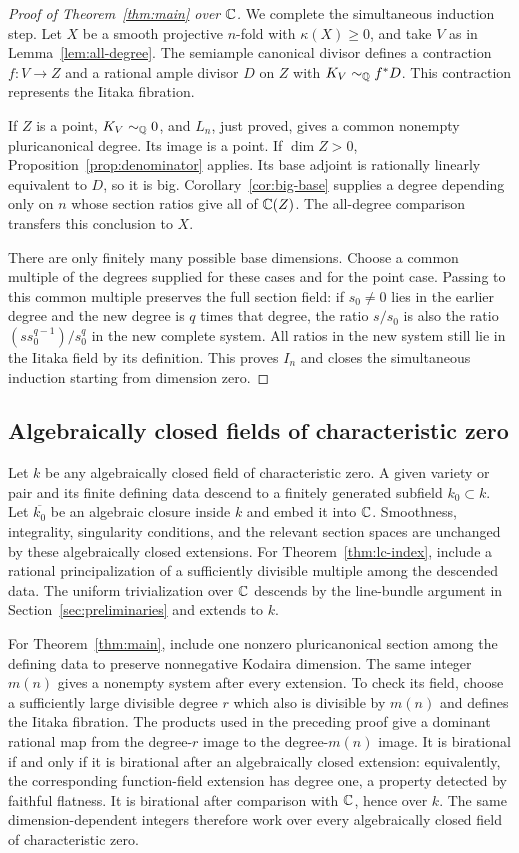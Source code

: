 \begin{proof}[Proof of Theorem~\ref{thm:main} over $\mathbb C$]
We complete the simultaneous induction step. Let $X$ be a smooth
projective $n$-fold with $\kappa(X)\geq0$, and take $V$ as in
Lemma~\ref{lem:all-degree}. The semiample canonical divisor defines a
contraction $f:V\to Z$ and a rational ample divisor $D$ on $Z$ with
$K_V\sim_\mathbb Q f^*D$. This contraction represents the Iitaka fibration.

If $Z$ is a point, $K_V\sim_\mathbb Q0$, and $L_n$, just proved, gives a
common nonempty pluricanonical degree. Its image is a point.
If $\dim Z>0$, Proposition~\ref{prop:denominator} applies. Its base
adjoint is rationally linearly equivalent to $D$, so it is big.
Corollary~\ref{cor:big-base} supplies a degree depending only on $n$
whose section ratios give all of $\mathbb C(Z)$. The all-degree comparison
transfers this conclusion to $X$.

There are only finitely many possible base dimensions. Choose a common
multiple of the degrees supplied for these cases and for the point
case. Passing to this common multiple preserves the full section
field: if $s_0\ne0$ lies in the earlier degree and the new degree is
$q$ times that degree, the ratio $s/s_0$ is also the ratio
$(s s_0^{q-1})/s_0^q$ in the new complete system. All ratios in the
new system still lie in the Iitaka field by its definition. This
proves $I_n$ and closes the simultaneous induction starting from
dimension zero.
\end{proof}

\subsection{Algebraically closed fields of characteristic zero}

Let $k$ be any algebraically closed field of characteristic zero.
A given variety or pair and its finite defining data descend to a
finitely generated subfield $k_0\subset k$. Let $\overline{k_0}$ be an
algebraic closure inside $k$ and embed it into $\mathbb C$. Smoothness,
integrality, singularity conditions, and the relevant section spaces
are unchanged by these algebraically closed extensions. For
Theorem~\ref{thm:lc-index}, include a rational principalization of a
sufficiently divisible multiple among the descended data. The
uniform trivialization over $\mathbb C$ descends by the line-bundle argument
in Section~\ref{sec:preliminaries} and extends to $k$.

For Theorem~\ref{thm:main}, include one nonzero pluricanonical section
among the defining data to preserve nonnegative Kodaira dimension.
The same integer $m(n)$ gives a nonempty system after every extension.
To check its field, choose a sufficiently large divisible degree $r$
which also is divisible by $m(n)$ and defines the Iitaka fibration.
The products used in the preceding proof give a dominant rational
map from the degree-$r$ image to the degree-$m(n)$ image. It is
birational if and only if it is birational after an algebraically
closed extension: equivalently, the corresponding function-field
extension has degree one, a property detected by faithful flatness.
It is birational after comparison with $\mathbb C$, hence over $k$.
The same dimension-dependent integers therefore work over every
algebraically closed field of characteristic zero.
